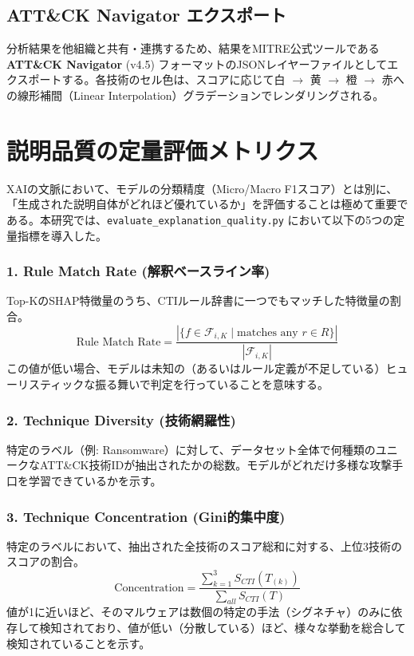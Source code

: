 \documentclass[11pt,a4paper,dvipdfmx]{article}
\begin{document}
\subsection{ATT\&CK Navigator エクスポート}
分析結果を他組織と共有・連携するため、結果をMITRE公式ツールである \textbf{ATT\&CK Navigator} (v4.5) フォーマットのJSONレイヤーファイルとしてエクスポートする。各技術のセル色は、スコアに応じて白 $\rightarrow$ 黄 $\rightarrow$ 橙 $\rightarrow$ 赤への線形補間（Linear Interpolation）グラデーションでレンダリングされる。

\section{説明品質の定量評価メトリクス}

XAIの文脈において、モデルの分類精度（Micro/Macro F1スコア）とは別に、「生成された説明自体がどれほど優れているか」を評価することは極めて重要である。本研究では、\texttt{evaluate\_explanation\_quality.py} において以下の5つの定量指標を導入した。

\subsubsection{1. Rule Match Rate (解釈ベースライン率)}
Top-KのSHAP特徴量のうち、CTIルール辞書に一つでもマッチした特徴量の割合。
\begin{equation}
    \text{Rule Match Rate} = \frac{|\{f \in \mathcal{F}_{i,K} \mid \text{matches any } r \in R\}|}{|\mathcal{F}_{i,K}|}
\end{equation}
この値が低い場合、モデルは未知の（あるいはルール定義が不足している）ヒューリスティックな振る舞いで判定を行っていることを意味する。

\subsubsection{2. Technique Diversity (技術網羅性)}
特定のラベル（例: Ransomware）に対して、データセット全体で何種類のユニークなATT\&CK技術IDが抽出されたかの総数。モデルがどれだけ多様な攻撃手口を学習できているかを示す。

\subsubsection{3. Technique Concentration (Gini的集中度)}
特定のラベルにおいて、抽出された全技術のスコア総和に対する、上位3技術のスコアの割合。
\begin{equation}
    \text{Concentration} = \frac{\sum_{k=1}^{3} S_{CTI}(T_{(k)})}{\sum_{all} S_{CTI}(T)}
\end{equation}
値が1に近いほど、そのマルウェアは数個の特定の手法（シグネチャ）のみに依存して検知されており、値が低い（分散している）ほど、様々な挙動を総合して検知されていることを示す。
\end{document}
